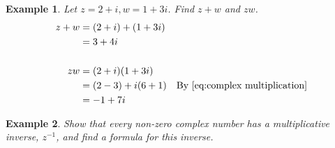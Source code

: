 \documentclass[11pt, oneside]{book}
\theoremstyle{break}
\newtheorem{eg}{Example}[section]
\begin{document}
\begin{eg}\label{eg:1}
	Let $z = 2 + i, w = 1 + 3i$. Find $z + w$ and $zw$.
	\begin{align*}
		z + w &= (2 + i) + (1 + 3i) \\
			  	&= 3 + 4i \\
			  	\\
		zw 		&= (2 + i)(1 + 3i) \\
					&= (2 - 3) + i (6 + 1) \quad \text{By } \cref{eq:complex multiplication}\\
					&= -1 + 7i
	\end{align*}
\end{eg}

\begin{eg}\label{eg:multiplicative inverse of a complex number}
	Show that every non-zero complex number has a multiplicative inverse, $z^{-1}$, and find a formula for this inverse.


\end{eg}
\end{document}
